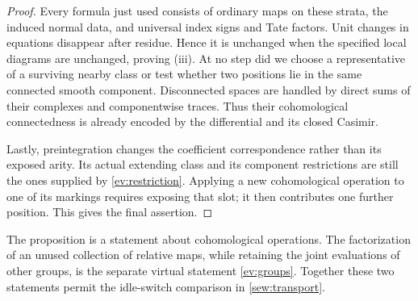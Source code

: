 \begin{proof}
Every formula just used consists of ordinary maps on these strata, the
induced normal data, and universal index signs and Tate factors.  Unit changes
in equations disappear after residue.  Hence it is unchanged when the
specified local diagrams are unchanged, proving (iii).  At no step did we
choose a representative of a surviving nearby class or test whether two
positions lie in the same connected smooth component.  Disconnected spaces
are handled by direct sums of their complexes and componentwise traces.
Thus their cohomological connectedness is already encoded by the differential
and its closed Casimir.

Lastly, preintegration changes the coefficient correspondence rather than
its exposed arity.  Its actual extending class and its component restrictions
are still the ones supplied by \cref{ev:restriction}.  Applying a new
cohomological operation to one of its markings requires exposing that slot;
it then contributes one further position.  This gives the final assertion.
\end{proof}

The proposition is a statement about cohomological operations.  The
factorization of an unused collection of relative maps, while retaining the
joint evaluations of other groups, is the separate virtual statement
\cref{ev:groups}.  Together these two statements permit the idle-switch
comparison in \cref{sew:transport}.
